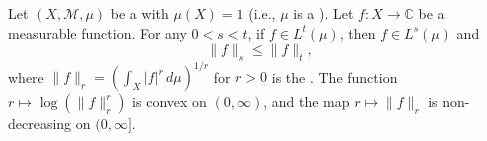 \begin{proposition} \label{proposition:lyapunov_inequality_for_L_p_norm_monotonicity}
Let $(X, \mathcal{M}, \mu)$ be a  with $\mu(X) = 1$ (i.e., $\mu$ is a ). Let $f : X \to \mathbb{C}$ be a measurable function. For any $0 < s < t$, if $f \in L^t(\mu)$, then $f \in L^s(\mu)$ and
$$\|f\|_s \leq \|f\|_t,$$
where $\|f\|_r = \left(\int_X |f|^r \, d\mu\right)^{1/r}$ for $r > 0$ is the . The function $r \mapsto \log(\|f\|_r^r)$ is convex on $(0, \infty)$, and the map $r \mapsto \|f\|_r$ is non-decreasing on $(0, \infty]$.
\end{proposition}

